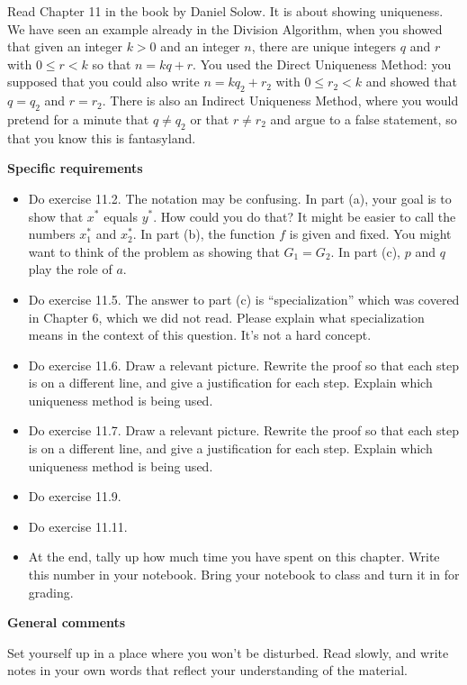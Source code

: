 
Read Chapter 11 in the book by Daniel Solow.
It is about showing uniqueness.
We have seen an example already in the Division Algorithm, when you showed that given an integer $k > 0$ and an integer $n$, there are unique integers $q$ and $r$ with $0 \leq r < k$ so that $n = kq + r$.
You used the Direct Uniqueness Method:  you supposed that you could also write $n = kq_2 + r_2$ with $0 \leq r_2 < k$ and showed that $q=q_2$ and $r = r_2$.
There is also an Indirect Uniqueness Method, where you would pretend for a minute that $q \neq q_2$ or that $r \neq r_2$ and argue to a false statement, so that you know this is fantasyland.

\vspace{0.1in}
\noindent
{\bf Specific requirements}
\vspace*{-0.15in}

\begin{itemize}
\item Do exercise 11.2.  The notation may be confusing.  In part (a), your goal is to show that $x^*$ equals $y^*$.  How could you do that?  It might be easier to call the numbers $x_1^*$ and $x_2^*$.  In part (b), the function $f$ is given and fixed.  You might want to think of the problem as showing that $G_1 = G_2$.  In part (c), $p$ and $q$ play the role of $a$.

\item Do exercise 11.5.  The answer to part (c) is ``specialization'' which was covered in Chapter 6, which we did not read.  Please explain what specialization means in the context of this question.  It's not a hard concept.

\item Do exercise 11.6.  
Draw a relevant picture.
Rewrite the proof so that each step is on a different line, and give a justification for each step.
Explain which uniqueness method is being used.

\item Do exercise 11.7.
Draw a relevant picture.
Rewrite the proof so that each step is on a different line, and give a justification for each step.
Explain which uniqueness method is being used.

\item Do exercise 11.9.

\item Do exercise 11.11.

\item At the end, tally up how much time you have spent on this chapter.
Write this number in your notebook.
Bring your notebook to class and turn it in for grading.
\end{itemize}

\noindent
{\bf General comments}

Set yourself up in a place where you won't be disturbed.
Read slowly, and write notes in your own words that reflect your understanding of the material.
